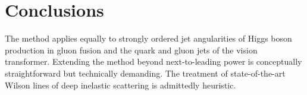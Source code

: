 \section{Conclusions}\label{sec:conclusions}

The method applies equally to strongly ordered jet angularities of Higgs
boson production in gluon fusion and the quark and gluon jets of the
vision transformer. Extending the method beyond next-to-leading power is
conceptually straightforward but technically demanding. The treatment of
state-of-the-art Wilson lines of deep inelastic scattering is admittedly
heuristic.

